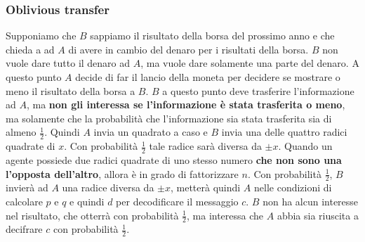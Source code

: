 \subsubsection{Oblivious transfer}
Supponiamo che $B$ sappiamo il risultato della borsa del prossimo anno e che chieda a ad $A$ di 
avere in cambio del denaro per i risultati della borsa. $B$ non vuole dare tutto il denaro ad $A$,
ma vuole dare solamente una parte del denaro. A questo punto $A$ decide di far il lancio della moneta
per decidere se mostrare o meno il risultato della borsa a $B$. $B$ a questo punto deve trasferire 
l'informazione ad $A$, ma \textbf{non gli interessa se l'informazione è stata trasferita o meno}, ma solamente
che la probabilità che l'informazione sia stata trasferita sia di almeno $\frac{1}{2}$.
Quindi $A$ invia un quadrato a caso e $B$ invia una delle quattro radici quadrate di $x$.
Con probabilità $\frac{1}{2}$ tale radice sarà diversa da $\pm x$. Quando un agente possiede 
due radici quadrate di uno stesso numero \textbf{che non sono una l'opposta dell'altro}, allora 
è in grado di fattorizzare $n$.
Con probabilità $\frac{1}{2}$, $B$ invierà ad $A$ una radice diversa da $\pm x$, metterà quindi 
$A$ nelle condizioni di calcolare $p$ e $q$ e quindi $d$ per decodificare il messaggio $c$.
$B$ non ha alcun interesse nel risultato, che otterrà con probabilità $\frac{1}{2}$, ma
interessa che $A$ abbia sia riuscita a decifrare $c$ con probabilità $\frac{1}{2}$.

